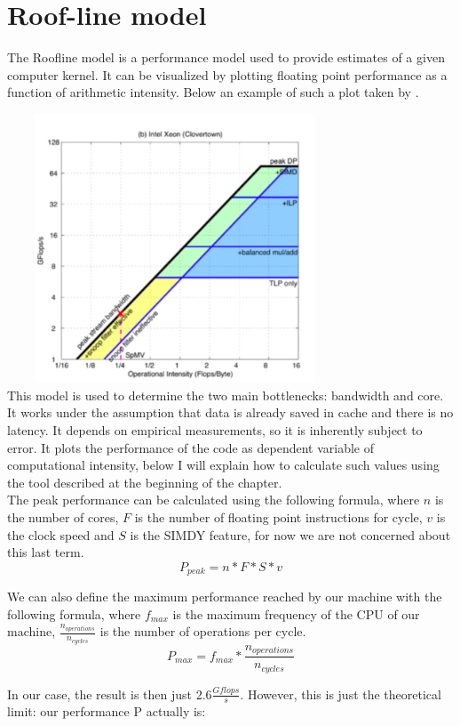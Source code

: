 \documentclass[11pt,a4paper,oneside,titlepage,openright]{book}
\begin{document}
\section{Roof-line model}
The Roofline model is a performance model used to provide estimates of a given computer kernel. 
It can be visualized by plotting floating point performance as a function of arithmetic intensity. 
Below an example of such a plot taken by \cite{roofmodel}.

\includegraphics[width=10cm, height=8cm]{roof_example}
\\This model is used to determine the two main bottlenecks: bandwidth and core. It works under the assumption that data is already saved in cache and there  is no latency. It depends on empirical measurements, so it is inherently subject to error. 
It plots the performance of the code as dependent variable of computational intensity, below I will explain how to calculate such values using the tool described at the beginning of the chapter. 
\\
The peak performance can be calculated using the following formula, where $n$ is the number of cores, $F$ is the number of floating point instructions for cycle, $v$ is the clock speed and $S$ is the SIMDY feature, for now we are not concerned about this last term. 
$$ P_{peak} = n * F * S * v $$ 

We can also define the maximum performance reached by our machine with the following formula, where $f_{max}$ is the maximum frequency of the CPU of our machine, $\frac{n_{operations}}{n_{cycles}}$ is the number of operations per cycle. 
$$P_{max} = f_{max} * \frac{n_{operations}}{n_{cycles}}$$ 

In our case, the result is then just 2.6$\frac{Gflops}{s}$.
However, this is just the theoretical limit: our performance P actually is: 
\end{document}
